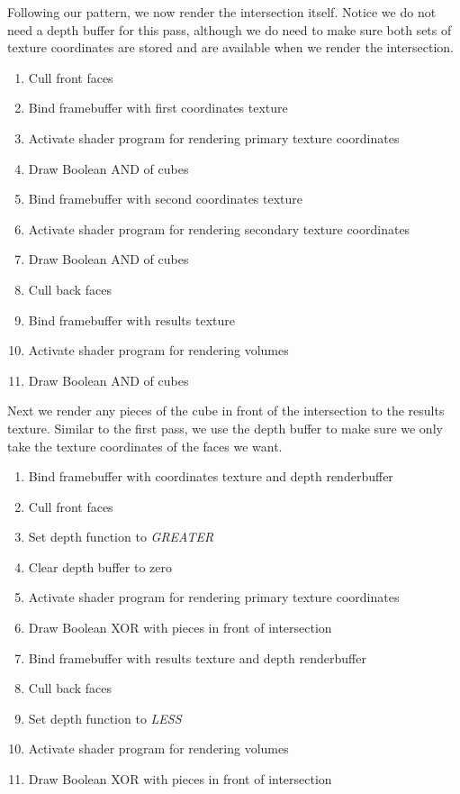 \documentclass{article}
\begin{document}
Following our pattern, we now render the intersection itself.  Notice we do not
need a depth buffer for this pass, although we do need to make sure both sets of
texture coordinates are stored and are available when we render the
intersection.

\begin{enumerate}
  \item Cull front faces
  \item Bind framebuffer with first coordinates texture
  \item Activate shader program for rendering primary texture coordinates
  \item Draw Boolean AND of cubes
  \item Bind framebuffer with second coordinates texture
  \item Activate shader program for rendering secondary texture coordinates
  \item Draw Boolean AND of cubes
  \item Cull back faces
  \item Bind framebuffer with results texture
  \item Activate shader program for rendering volumes
  \item Draw Boolean AND of cubes
\end{enumerate}

Next we render any pieces of the cube in front of the intersection to the
results texture.  Similar to the first pass, we use the depth buffer to make
sure we only take the texture coordinates of the faces we want.

\begin{enumerate}
  \item Bind framebuffer with coordinates texture and depth renderbuffer
  \item Cull front faces
  \item Set depth function to \emph{GREATER}
  \item Clear depth buffer to zero
  \item Activate shader program for rendering primary texture coordinates
  \item Draw Boolean XOR with pieces in front of intersection
  \item Bind framebuffer with results texture and depth renderbuffer
  \item Cull back faces
  \item Set depth function to \emph{LESS}
  \item Activate shader program for rendering volumes
  \item Draw Boolean XOR with pieces in front of intersection
\end{enumerate}
\end{document}
